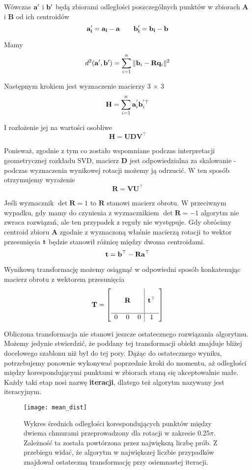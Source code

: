 \documentclass{article}
\begin{document}
Wówczas $\vb{a'}$ i $\vb{b'}$ będą zbiorami odległości poszczególnych punktów w zbiorach $\mathbf{A}$ i $\mathbf{B}$ od ich centroidów
\[\vb{a'_i = a_i - a \qquad b'_i = b_i - b} \]

Mamy
\[d^2(\vb{a'}, \vb{b'}) = \sum_{i=1}^n \| \vb{b}_{i} - \mathbf{R} \vb{q}_{i}\|^2 \]

Następnym krokiem jest wyznaczenie macierzy 3 $\times$ 3 
\[\mathbf{H} = \sum_{i=1}^n \vb{a}_i^{'} \vb{b}_{i}^{'\top} \]

I rozłożenie jej na wartości osobliwe
\[\mathbf{H = UDV^\top} \]

Ponieważ, zgodnie z tym co zostało wspomniane podczas interpretacji geometrycznej rozkładu SVD, macierz $\mathbf{D}$ jest odpowiedzialna za skalowanie - podczas wyznaczenia wynikowej rotacji możemy ją odrzucić. W ten sposób otrzymujemy wyrażenie
\[\mathbf{R = VU^\top} \]

Jeśli wyznacznik $\det \mathbf{R} = 1$ to  $\mathbf{R}$ stanowi macierz obrotu. W przeciwnym wypadku, gdy mamy do czynienia z wyznacznikiem $\det \mathbf{R}= -1$ algorytm nie zwraca rozwiązań, ale ten przypadek z reguły nie występuje. Gdy obrócimy centroid zbioru $\mathbf{A}$ zgodnie z wyznaczoną właśnie macierzą rotacji to wektor przesunięcia $\vb{t}$ będzie stanowił różnicę między dwoma centroidami.
\[\vb{t} = \vb{b}^\top - \mathbf{R} \vb{a}^\top \]

Wynikową transformację możemy osiągnąć w odpowiedni sposób konkatenując macierz obrotu z wektorem przesunięcia
\[\mathbf{T} = \left[
\begin{array}{ccc|c}
& & & \\
& \mathbf{R} & & \vb{t}^\top \\
& & & \\
\hline
0 & 0 & 0 & 1
\end{array}
\right]
\]

Obliczona transformacja nie stanowi jeszcze ostatecznego rozwiązania algorytmu. Możemy jedynie stwierdzić, że poddany tej transformacji obiekt znajduje bliżej docelowego szablonu niż był do tej pory. Dążąc do ostatecznego wyniku, potrzebujemy ponownie wykonywać poprzednie kroki do momentu, aż odległości między korespondującymi punktami w zbiorach staną się akceptowalnie małe. Każdy taki etap nosi nazwę \textbf{iteracji}, dlatego też algorytm nazywany jest iteracyjnym.

\begin{figure}[h]
\centering
\texttt{[image: mean\_dist]}
\caption{Wykres średnich odległości korespondujących punktów między dwiema chmurami przeprowadzony dla rotacji w zakresie 0.25$\pi$. Zależność ta została powtórzona przez największą liczbę prób. Z przebiegu widać, że algorytm w największej liczbie przypadków znajdował ostateczną transformację przy osiemnastej iteracji.}
\end{figure}
\end{document}
